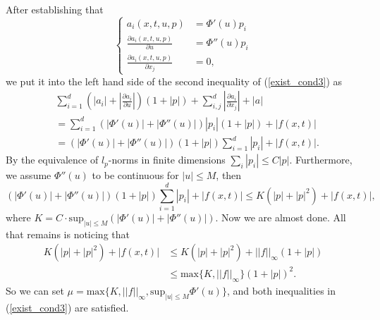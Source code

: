 \documentclass[11pt, a4paper]{article}
\begin{document}
\begin{enumerate}[a)]
	After establishing that
	\begin{equation*}
		\begin{cases}
			a_i(x,t,u,p) &= \Phi'(u)p_i \\
			\frac{\partial a_i(x,t,u,p)}{\partial u} &= \Phi''(u)p_i \\
			\frac{\partial a_i(x,t,u,p)}{\partial x_j} &= 0,
		\end{cases}	
	\end{equation*}
	we put it into the left hand side of the second inequality of (\ref{exist_cond3}) as
	\begin{align*}
	&\sum_{i=1}^d\left( |a_i| + \left| \frac{\partial a_i}{\partial u}\right| \right)(1+|p|) + \sum_{i,j}^d\left| \frac{\partial a_i}{\partial x_j} \right| + |a| \\
	&= \sum_{i=1}^d\left( |\Phi'(u)| + |\Phi''(u)| \right)|p_i|(1+|p|) + |f(x,t)| \\
	&= (|\Phi'(u)| + |\Phi''(u)|)(1+|p|)\sum_{i=1}^d|p_i| + |f(x,t)|.
	\end{align*}
	By the equivalence of $l_p$-norms in finite dimensions $\sum_i |p_i| \leq C|p|$. Furthermore, we assume $\Phi''(u)$ to be continuous for $|u|\leq M$, then
	\begin{equation*}
	(|\Phi'(u)| + |\Phi''(u)|)(1+|p|)\sum_{i=1}^d|p_i| + |f(x,t)| \leq K(|p| + |p|^2) + |f(x,t)|,
	\end{equation*}
	where $K = C\cdot \text{sup}_{|u|\leq M}(|\Phi'(u)| + |\Phi''(u)|)$. Now we are almost done. All that remains is noticing that
	\begin{align*}
	K(|p| + |p|^2) + |f(x,t)| &\leq K(|p| + |p|^2) + ||f||_{\infty}(1+|p|) \\
	&\leq \text{max}\{ K, ||f||_\infty \} (1+|p|)^2.
	\end{align*}
	So we can set $\mu = \text{max}\{K, ||f||_\infty, \text{sup}_{|u|\leq M}\Phi'(u) \}$, and both inequalities in (\ref{exist_cond3}) are satisfied.
	

\end{enumerate}
\end{document}
